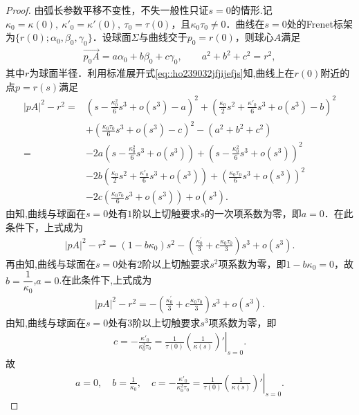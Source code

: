 \documentclass[../../main.tex]{subfiles}%
\begin{document}
\begin{proof}
由弧长参数平移不变性，不失一般性只证$s=0$的情形.记$\kappa_0=\kappa(0),\ \kappa'_0=\kappa'(0),\ \tau_0=\tau(0)$，且$\kappa_0\tau_0\neq0$．曲线在$s=0$处的Frenet标架为$\{r(0);\alpha_0,\beta_0,\gamma_0\}$．设球面$\Sigma$与曲线交于$p_0=r(0)$，则球心$A$满足
\begin{align*}
\overrightarrow{p_0A}=a\alpha_0+b\beta_0+c\gamma_0,\qquad a^2+b^2+c^2=r^2,
\end{align*}
其中$r$为球面半径．利用标准展开式\eqref{eq::ho239032jfjijefjs}知,曲线上在$r(0)$附近的点$p=r(s)$满足
\begin{align*}
|pA|^2-r^2=&\left(s-\frac{\kappa_0^2}{6}s^3+o(s^3)-a\right)^2+\left(\frac{\kappa_0}{2}s^2+\frac{\kappa'_0}{6}s^3+o(s^3)-b\right)^2\\
&+\left(\frac{\kappa_0\tau_0}{6}s^3+o(s^3)-c\right)^2-(a^2+b^2+c^2)\\
=&-2a\left(s-\frac{\kappa_0^2}{6}s^3+o(s^3)\right)+\left(s-\frac{\kappa_0^2}{6}s^3+o(s^3)\right)^2\\
&-2b\left(\frac{\kappa_0}{2}s^2+\frac{\kappa'_0}{6}s^3+o(s^3)\right)+\left(\frac{\kappa_0\tau_0}{6}s^3+o(s^3)\right)^2\\
&-2c\left(\frac{\kappa_0\tau_0}{6}s^3+o(s^3)\right)+o(s^3).
\end{align*}
由知,曲线与球面在$s=0$处有$1$阶以上切触要求$s$的一次项系数为零，即$a=0$．在此条件下，上式成为
\begin{align*}
|pA|^2-r^2=\left( 1-b\kappa _0 \right) s^2-\left( \frac{\kappa _{0}^{\prime}}{3}+c\frac{\kappa _0\tau _0}{3} \right) s^3+o\left( s^3 \right) .
\end{align*}
再由知,曲线与球面在$s=0$处有$2$阶以上切触要求$s^2$项系数为零，即$1-b\kappa_0=0$，故$b=\dfrac{1}{\kappa_0}$,$a=0$.在此条件下,上式成为
\begin{align*}
|pA|^2-r^2=-\left( \frac{\kappa _{0}^{\prime}}{3}+c\frac{\kappa _0\tau _0}{3} \right) s^3+o\left( s^3 \right) .
\end{align*}
由知,曲线与球面在$s=0$处有$3$阶以上切触要求$s^3$项系数为零，即
\begin{align*}
c=-\frac{\kappa'_0}{\kappa_0^2\tau_0}=\frac{1}{\tau \left( 0 \right)}\left.\left( \frac{1}{\kappa \left( s \right)} \right) ' \right|_{s=0}.
\end{align*}
故
\begin{align*}
a=0,\quad b=\frac{1}{\kappa_0},\quad c=-\frac{\kappa'_0}{\kappa_0^2\tau_0}=\frac{1}{\tau \left( 0 \right)}\left.\left( \frac{1}{\kappa \left( s \right)} \right) ' \right|_{s=0}.

\end{align*}
\end{proof}
\end{document}
